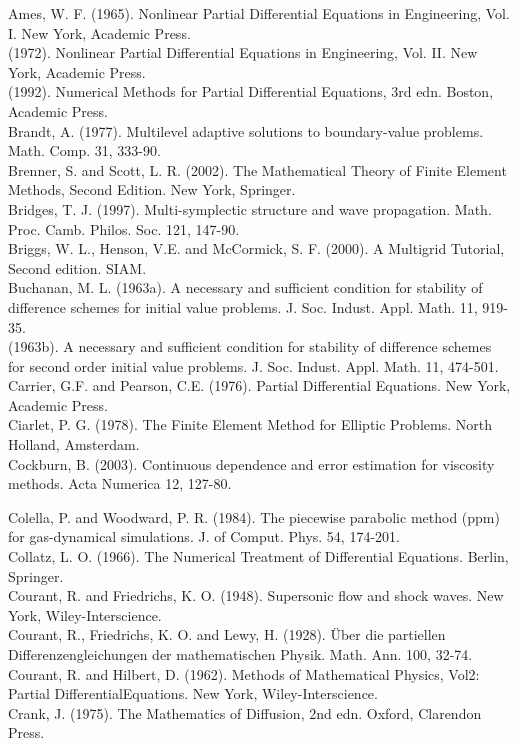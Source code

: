 \documentclass[10pt]{article}
\begin{document}
Ames, W. F. (1965). Nonlinear Partial Differential Equations in Engineering, Vol. I. New York, Academic Press.\\
(1972). Nonlinear Partial Differential Equations in Engineering, Vol. II. New York, Academic Press.\\
(1992). Numerical Methods for Partial Differential Equations, 3rd edn. Boston, Academic Press.\\
Brandt, A. (1977). Multilevel adaptive solutions to boundary-value problems. Math. Comp. 31, 333-90.\\
Brenner, S. and Scott, L. R. (2002). The Mathematical Theory of Finite Element Methods, Second Edition. New York, Springer.\\
Bridges, T. J. (1997). Multi-symplectic structure and wave propagation. Math. Proc. Camb. Philos. Soc. 121, 147-90.\\
Briggs, W. L., Henson, V.E. and McCormick, S. F. (2000). A Multigrid Tutorial, Second edition. SIAM.\\
Buchanan, M. L. (1963a). A necessary and sufficient condition for stability of difference schemes for initial value problems. J. Soc. Indust. Appl. Math. 11, 919-35.\\
(1963b). A necessary and sufficient condition for stability of difference schemes for second order initial value problems. J. Soc. Indust. Appl. Math. 11, 474-501.\\
Carrier, G.F. and Pearson, C.E. (1976). Partial Differential Equations. New York, Academic Press.\\
Ciarlet, P. G. (1978). The Finite Element Method for Elliptic Problems. North Holland, Amsterdam.\\
Cockburn, B. (2003). Continuous dependence and error estimation for viscosity methods. Acta Numerica 12, 127-80.

Colella, P. and Woodward, P. R. (1984). The piecewise parabolic method (ppm) for gas-dynamical simulations. J. of Comput. Phys. 54, 174-201.\\
Collatz, L. O. (1966). The Numerical Treatment of Differential Equations. Berlin, Springer.\\
Courant, R. and Friedrichs, K. O. (1948). Supersonic flow and shock waves. New York, Wiley-Interscience.\\
Courant, R., Friedrichs, K. O. and Lewy, H. (1928). Über die partiellen Differenzengleichungen der mathematischen Physik. Math. Ann. 100, 32-74.\\
Courant, R. and Hilbert, D. (1962). Methods of Mathematical Physics, Vol2: Partial DifferentialEquations. New York, Wiley-Interscience.\\
Crank, J. (1975). The Mathematics of Diffusion, 2nd edn. Oxford, Clarendon Press.
\end{document}
